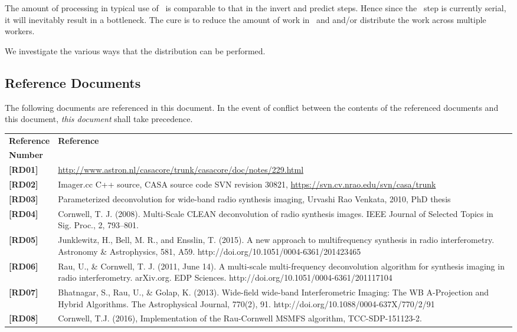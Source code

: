 \documentclass[11pt,a4paper,variablewidth]{article}
\begin{document}
The amount of processing in typical use of \MAM\ is comparable to that in the invert and predict steps. Hence since the \MAM\ step is currently serial, it will inevitably result in a bottleneck. The cure is to reduce the amount of work in \MAM\ and and/or distribute the work across multiple workers.

We investigate the various ways that the distribution can be performed.

\newpage

\subsection*{Reference Documents}

The following documents are referenced in this document. In the event of
conflict between the contents of the referenced documents and this document,
\emph{this document} shall take precedence.

 \begin{center}
 \begin{tabularx}{\textwidth}{|l|X|}
     \hline
     \bf{Reference} & \bf{Reference}\\
     \bf{Number} & \\
     \hline
   {\bf [RD01]} & \url{http://www.astron.nl/casacore/trunk/casacore/doc/notes/229.html}\\
   {\bf [RD02]} & Imager.cc C++ source, CASA source code SVN revision 30821, \url{https://svn.cv.nrao.edu/svn/casa/trunk}\\ 
   {\bf [RD03]} & Parameterized deconvolution for wide-band radio synthesis imaging, Urvashi Rao Venkata, 2010, PhD thesis\\
   {\bf [RD04]} & Cornwell, T. J. (2008). Multi-Scale CLEAN deconvolution of radio synthesis images. IEEE Journal of Selected Topics in Sig. Proc., 2, 793–801.\\
   {\bf [RD05]} & Junklewitz, H., Bell, M. R., and Ensslin, T. (2015). A new approach to multifrequency synthesis in radio interferometry. Astronomy \& Astrophysics, 581, A59. http://doi.org/10.1051/0004-6361/201423465 \\
	{\bf [RD06]} & Rau, U., \& Cornwell, T. J. (2011, June 14). A multi-scale multi-frequency deconvolution algorithm for synthesis imaging in radio interferometry. arXiv.org. EDP Sciences. http://doi.org/10.1051/0004-6361/201117104   \\
	{\bf [RD07]} & Bhatnagar, S., Rau, U., \& Golap, K. (2013). Wide-field wide-band Interferometric Imaging: The WB A-Projection and Hybrid Algorithms. The Astrophysical Journal, 770(2), 91. http://doi.org/10.1088/0004-637X/770/2/91 \\
	{\bf [RD08]} & Cornwell, T.J. (2016), Implementation of the Rau-Cornwell MSMFS algorithm, TCC-SDP-151123-2. \\
	\hline
 \end{tabularx}
\end{center}
\end{document}
